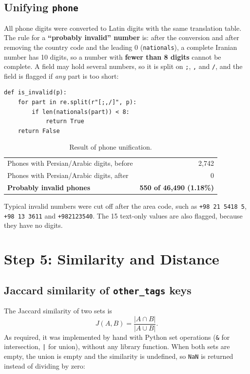 \documentclass[11pt,a4paper]{article}
\newcommand{\col}[1]{\texttt{#1}}
\begin{document}
\subsection{Unifying \col{phone}}

All phone digits were converted to Latin digits with the same translation table.
The rule for a \textbf{``probably invalid'' number} is: after the conversion and after
removing the country code and the leading 0 (\col{nationals}), a complete Iranian number has
10 digits, so a number with \textbf{fewer than 8 digits} cannot be complete. A field may hold
several numbers, so it is split on \col{;}, \col{,} and \col{/}, and the field is flagged if
\emph{any} part is too short:

\begin{lstlisting}
def is_invalid(p):
    for part in re.split(r"[;,/]", p):
        if len(nationals(part)) < 8:
            return True
    return False
\end{lstlisting}

\begin{table}[H]
\centering
\caption{Result of phone unification.}
\begin{tabular}{lr}
\toprule
Phones with Persian/Arabic digits, before & 2{,}742 \\
Phones with Persian/Arabic digits, after  & 0 \\
\textbf{Probably invalid phones} & \textbf{550 of 46{,}490 (1.18\%)} \\
\bottomrule
\end{tabular}
\end{table}

Typical invalid numbers were cut off after the area code, such as \col{+98 21 5418 5},
\col{+98 13 3611} and \col{+982123540}. The 15 text-only values are also flagged, because they have no digits.

\section{Step 5: Similarity and Distance}

\subsection{Jaccard similarity of \col{other\_tags} keys}

The Jaccard similarity of two sets is
\[
J(A,B) = \frac{|A\cap B|}{|A\cup B|}.
\]
As required, it was implemented by hand with Python set operations (\col{\&} for
intersection, \col{|} for union), without any library function. When both sets are empty,
the union is empty and the similarity is undefined, so \col{NaN} is returned instead of
dividing by zero:
\end{document}
